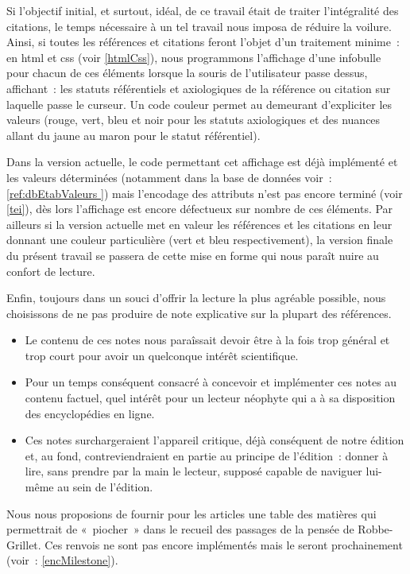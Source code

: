 \documentclass[12pt, a4paper]{article}
\begin{document}
Si l'objectif initial, et surtout, idéal, de ce travail était de traiter l'intégralité des citations, le temps nécessaire à un tel travail nous imposa de réduire la voilure.
Ainsi, si toutes les références et citations feront l'objet d'un traitement minime~: en html et css (voir \ref{htmlCss}), nous programmons l'affichage d'une infobulle pour chacun de ces éléments lorsque la souris de l'utilisateur passe dessus, affichant~: les statuts référentiels et axiologiques de la référence ou citation sur laquelle passe le curseur. Un code couleur permet au demeurant d'expliciter les valeurs (rouge, vert, bleu et noir pour les statuts axiologiques et des nuances allant du jaune au maron pour le statut référentiel).

Dans la version actuelle, le code permettant cet affichage est déjà implémenté et les valeurs déterminées (notamment dans la base de données voir~: \ref{ref:dbEtabValeurs
}) mais l'encodage des attributs n'est pas encore terminé (voir \ref{tei}), dès lors l'affichage est encore défectueux sur nombre de ces éléments. Par ailleurs si la version actuelle met en valeur les références et les citations en leur donnant une couleur particulière (vert et bleu respectivement), la version finale du présent travail se passera de cette mise en forme qui nous paraît nuire au confort de lecture.

Enfin, toujours dans un souci d'offrir la lecture la plus agréable possible, nous choisissons de ne pas produire de note explicative sur la plupart des références.
\begin{itemize}
    \item Le contenu de ces notes nous paraîssait devoir être à la fois trop général et trop court pour avoir un quelconque intérêt scientifique.
    \item Pour un temps conséquent consacré à concevoir et implémenter ces notes au contenu factuel, quel intérêt pour un lecteur néophyte qui a à sa disposition des encyclopédies en ligne.
    \item Ces notes surchargeraient l'appareil critique, déjà conséquent de notre édition et, au fond, contreviendraient en partie au principe de l'édition~: donner à lire, sans prendre par la main le lecteur, supposé capable de naviguer lui-même au sein de l'édition.
\end{itemize}





Nous nous proposions de fournir pour les articles une table des matières qui permettrait de «~piocher~» dans le recueil des passages de la pensée de Robbe-Grillet. Ces renvois ne sont pas encore implémentés mais le seront prochainement (voir~: \ref{encMilestone}).
\end{document}
